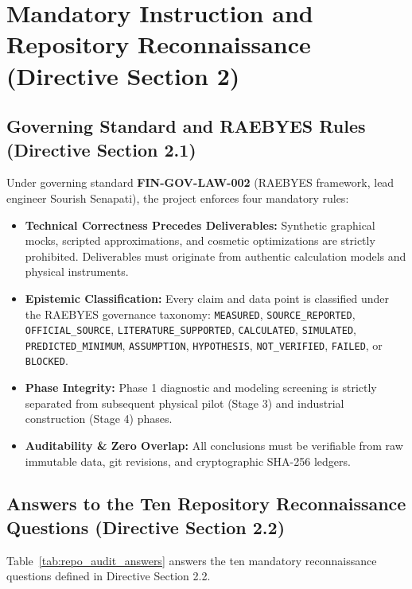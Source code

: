 \documentclass[10pt,a4paper]{article}
\begin{document}
\section{Mandatory Instruction and Repository Reconnaissance (Directive Section 2)}

\subsection{Governing Standard and RAEBYES Rules (Directive Section 2.1)}
Under governing standard \textbf{FIN-GOV-LAW-002} (RAEBYES framework, lead engineer Sourish Senapati), the project enforces four mandatory rules:
\begin{itemize}
    \item \textbf{Technical Correctness Precedes Deliverables:} Synthetic graphical mocks, scripted approximations, and cosmetic optimizations are strictly prohibited. Deliverables must originate from authentic calculation models and physical instruments.
    \item \textbf{Epistemic Classification:} Every claim and data point is classified under the RAEBYES governance taxonomy: \texttt{MEASURED}, \texttt{SOURCE\_REPORTED}, \texttt{OFFICIAL\_SOURCE}, \texttt{LITERATURE\_SUPPORTED}, \texttt{CALCULATED}, \texttt{SIMULATED}, \texttt{PREDICTED\_MINIMUM}, \texttt{ASSUMPTION}, \texttt{HYPOTHESIS}, \texttt{NOT\_VERIFIED}, \texttt{FAILED}, or \texttt{BLOCKED}.
    \item \textbf{Phase Integrity:} Phase 1 diagnostic and modeling screening is strictly separated from subsequent physical pilot (Stage 3) and industrial construction (Stage 4) phases.
    \item \textbf{Auditability \& Zero Overlap:} All conclusions must be verifiable from raw immutable data, git revisions, and cryptographic SHA-256 ledgers.
\end{itemize}

\subsection{Answers to the Ten Repository Reconnaissance Questions (Directive Section 2.2)}
Table~\ref{tab:repo_audit_answers} answers the ten mandatory reconnaissance questions defined in Directive Section 2.2.
\end{document}
